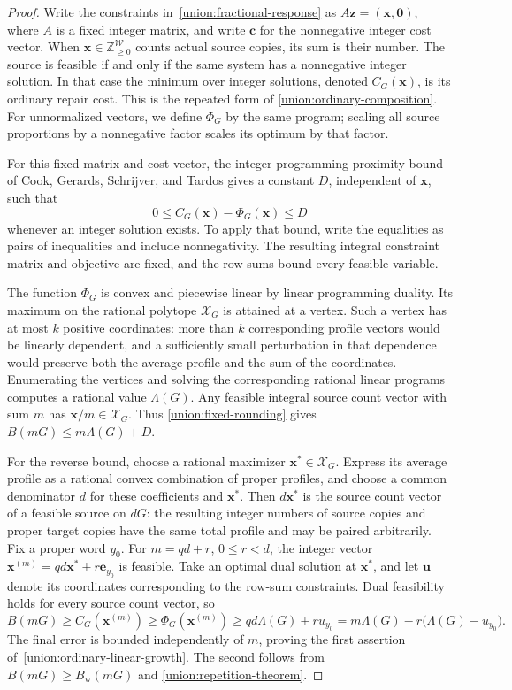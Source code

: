 \documentclass[11pt,reqno]{amsart}
\numberwithin{equation}{section}
\theoremstyle{definition}
\theoremstyle{remark}
\begin{document}
\begin{proof}
Write the constraints in~\eqref{union:fractional-response} as
$A\mathbf z=(\mathbf x,\mathbf0)$, where $A$ is a fixed integer
matrix, and write $\mathbf c$ for the nonnegative integer cost vector.
When $\mathbf x\in\mathbb Z_{\ge0}^{\mathcal W}$ counts actual
source copies, its sum is their number. The source is feasible if
and only if the same system has a nonnegative integer solution.
In that case the minimum over integer solutions, denoted
$C_G(\mathbf x)$, is its ordinary repair cost. This is the repeated
form of \cref{union:ordinary-composition}. For unnormalized vectors,
we define $\Phi_G$ by the same program; scaling all source proportions
by a nonnegative factor scales its optimum by that factor.

For this fixed matrix and cost vector, the integer-programming
proximity bound of Cook, Gerards, Schrijver, and Tardos
\cite[Corollary~2]{cook1986} gives a constant $D$, independent of
$\mathbf x$, such that
\begin{equation}\label{union:fixed-rounding}
 0\le C_G(\mathbf x)-\Phi_G(\mathbf x)\le D
\end{equation}
whenever an integer solution exists. To apply that bound, write the
equalities as pairs of inequalities and include nonnegativity.
The resulting integral constraint matrix and objective are fixed,
and the row sums bound every feasible variable.

The function $\Phi_G$ is convex and piecewise linear by linear
programming duality. Its maximum on the rational polytope
$\mathcal X_G$ is attained at a vertex. Such a vertex has at most
$k$ positive coordinates: more than $k$ corresponding profile vectors
would be linearly dependent, and a sufficiently small perturbation
in that dependence would preserve both the average profile and the
sum of the coordinates. Enumerating the vertices and solving the
corresponding rational linear programs computes a rational value
$\Lambda(G)$. Any feasible integral source count vector with sum
$m$ has $\mathbf x/m\in\mathcal X_G$. Thus
\eqref{union:fixed-rounding} gives
$B(mG)\le m\Lambda(G)+D$.

For the reverse bound, choose a rational maximizer
$\mathbf x^*\in\mathcal X_G$. Express its average profile as a
rational convex combination of proper profiles, and choose a common
denominator $d$ for these coefficients and $\mathbf x^*$.
Then $d\mathbf x^*$ is the source count vector of a feasible source
on $dG$: the resulting integer numbers of source copies and proper
target copies have the same total profile and may be paired
arbitrarily. Fix a proper word $y_0$. For $m=qd+r$, $0\le r<d$, the
integer vector
$\mathbf x^{(m)}=qd\mathbf x^*+r\mathbf e_{y_0}$ is feasible.
Take an optimal dual solution at $\mathbf x^*$, and let
$\mathbf u$ denote its coordinates corresponding to the row-sum
constraints. Dual feasibility holds for every source count vector,
so
\[
 B(mG)\ge C_G(\mathbf x^{(m)})
 \ge\Phi_G(\mathbf x^{(m)})
 \ge qd\Lambda(G)+ru_{y_0}
 =m\Lambda(G)-r\bigl(\Lambda(G)-u_{y_0}\bigr).
\]
The final error is bounded independently of $m$, proving the first
assertion of~\eqref{union:ordinary-linear-growth}. The second follows
from $B(mG)\ge B_{\mathrm w}(mG)$ and
\cref{union:repetition-theorem}.


\end{proof}
\end{document}
